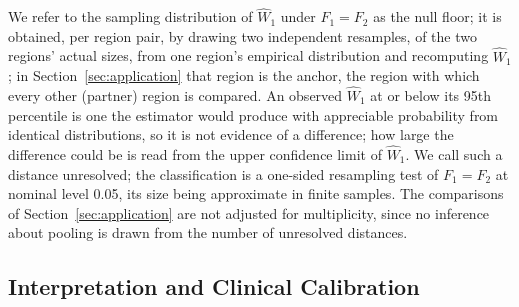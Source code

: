 \documentclass[AMA,Times1COL]{WileyNJDv5}
\begin{document}
We refer to the sampling distribution of $\widehat{W}_1$ under $F_1 = F_2$ as the null floor; it is obtained, per region pair, by drawing two independent resamples, of the two regions' actual sizes, from one region's empirical distribution and recomputing $\widehat{W}_1$; in Section~\ref{sec:application} that region is the anchor, the region with which every other (partner) region is compared. An observed $\widehat{W}_1$ at or below its 95th percentile is one the estimator would produce with appreciable probability from identical distributions, so it is not evidence of a difference; how large the difference could be is read from the upper confidence limit of $\widehat{W}_1$. We call such a distance unresolved; the classification is a one-sided resampling test of $F_1 = F_2$ at nominal level 0.05, its size being approximate in finite samples. The comparisons of Section~\ref{sec:application} are not adjusted for multiplicity, since no inference about pooling is drawn from the number of unresolved distances.

\subsection{Interpretation and Clinical Calibration}\label{sec:inference}

\end{document}
